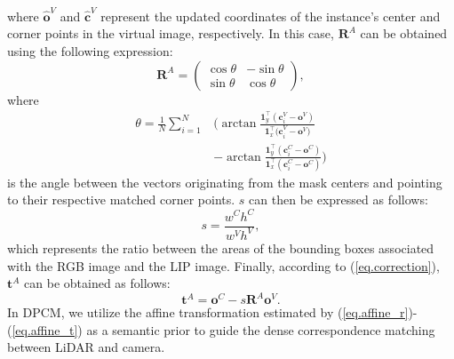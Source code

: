 where $\hat{\boldsymbol{o}}^V$ and $\hat{\boldsymbol{c}}^V$ represent the updated coordinates of the instance's center and corner points in the virtual image, respectively.
In this case, $\boldsymbol{R}^A$ can be obtained using the following expression:
\begin{equation}
\label{eq.affine_r}
\boldsymbol{R}^A = 
\begin{pmatrix}
\cos{\theta} & -\sin{\theta} \\
\sin{\theta} & \cos{\theta}
\end{pmatrix},
\end{equation}
where 
\begin{equation}
\begin{aligned}
{\theta} = \frac{1}{N}\sum_{i=1}^{N}&{\bigg(\arctan{\frac{\boldsymbol{1}_y^\top({{\boldsymbol{c}}}^V_i  - {{\boldsymbol{o}}^V})}{\boldsymbol{1}_x^\top{({\boldsymbol{c}}}^V_i - {{\boldsymbol{o}}^V})}}}\\
&  - \arctan{\frac{\boldsymbol{1}_y^\top({{\boldsymbol{c}}}^C_i - {{\boldsymbol{o}}^C})}{\boldsymbol{1}_x^\top({{\boldsymbol{c}}}^C_i - {{\boldsymbol{o}}^C})}}\bigg)
\end{aligned}
\label{eq.affine_theta}
\end{equation}
is the angle between the vectors originating from the mask centers and pointing to their respective matched corner points. $s$ can then be expressed as follows:
\begin{equation}
s = \frac{w^Ch^C}{w^Vh^V},
\label{eq.affine_s}
\end{equation}
which represents the ratio between the areas of the bounding boxes associated with the RGB image and the LIP image. Finally, according to (\ref{eq.correction}), $\boldsymbol{t}^A$ can be obtained as follows:
\begin{equation}
\boldsymbol{t}^A = {{\boldsymbol{o}}^C} - s\boldsymbol{R}^A{{\boldsymbol{o}}^V}.
\label{eq.affine_t}
\end{equation}
In DPCM, we utilize the affine transformation estimated by (\ref{eq.affine_r})-(\ref{eq.affine_t}) as a semantic prior to guide the dense correspondence matching between LiDAR and camera.

